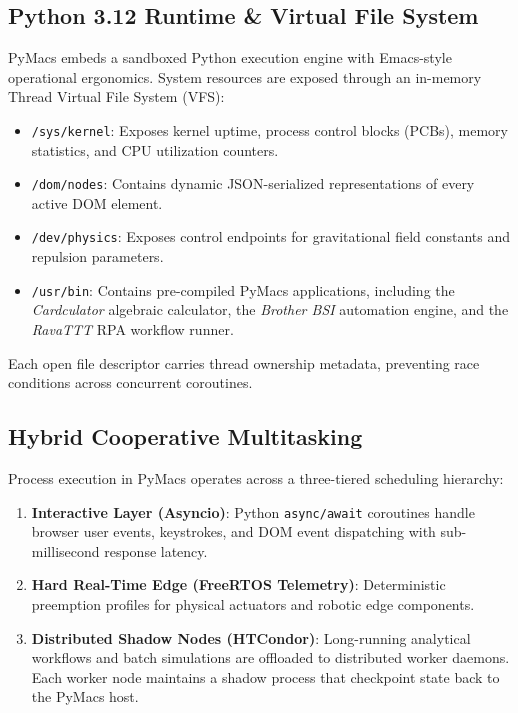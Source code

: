 \documentclass[10pt,twocolumn,letterpaper]{article}
\begin{document}
\subsection{Python 3.12 Runtime \& Virtual File System}
PyMacs embeds a sandboxed Python execution engine with Emacs-style operational ergonomics. System resources are exposed through an in-memory Thread Virtual File System (VFS):
\begin{itemize}
    \item \texttt{/sys/kernel}: Exposes kernel uptime, process control blocks (PCBs), memory statistics, and CPU utilization counters.
    \item \texttt{/dom/nodes}: Contains dynamic JSON-serialized representations of every active DOM element.
    \item \texttt{/dev/physics}: Exposes control endpoints for gravitational field constants and repulsion parameters.
    \item \texttt{/usr/bin}: Contains pre-compiled PyMacs applications, including the \textit{Cardculator} algebraic calculator, the \textit{Brother BSI} automation engine, and the \textit{RavaTTT} RPA workflow runner.
\end{itemize}

Each open file descriptor carries thread ownership metadata, preventing race conditions across concurrent coroutines.

\subsection{Hybrid Cooperative Multitasking}
Process execution in PyMacs operates across a three-tiered scheduling hierarchy:
\begin{enumerate}
    \item \textbf{Interactive Layer (Asyncio)}: Python \texttt{async/await} coroutines handle browser user events, keystrokes, and DOM event dispatching with sub-millisecond response latency.
    \item \textbf{Hard Real-Time Edge (FreeRTOS Telemetry)}: Deterministic preemption profiles for physical actuators and robotic edge components.
    \item \textbf{Distributed Shadow Nodes (HTCondor)}: Long-running analytical workflows and batch simulations are offloaded to distributed worker daemons. Each worker node maintains a shadow process that checkpoint state back to the PyMacs host.
\end{enumerate}
\end{document}
